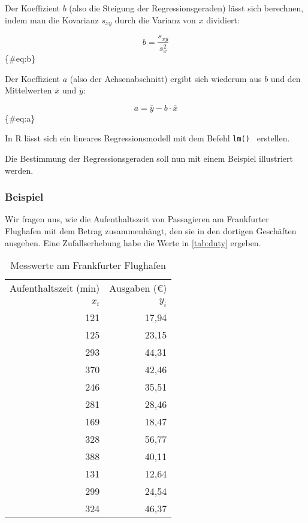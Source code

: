 \documentclass[
  ngerman,
]{article}
\begin{document}
Der Koeffizient \(b\) (also die Steigung der Regressionsgeraden) lässt sich berechnen, indem man die Kovarianz \(s_{xy}\) durch die Varianz von \(x\) dividiert:

\[
b=\frac{s_{xy}}{s^2_x}
\]\{\#eq:b\}

Der Koeffizient \(a\) (also der Achsenabschnitt) ergibt sich wiederum aus \(b\) und den Mittelwerten \(\bar{x}\) und \(\bar{y}\):

\nopagebreak

\[
a=\bar{y}-b\cdot\bar{x}
\]\{\#eq:a\}

\begin{rtip}
In R lässt sich ein lineares Regressionsmodell mit dem Befehl {\tt lm() } erstellen.
\end{rtip}

Die Bestimmung der Regressionsgeraden soll nun mit einem Beispiel illustriert werden.

\hypertarget{beispiel-26}{%
\subsubsection{Beispiel}\label{beispiel-26}}

Wir fragen uns, wie die Aufenthaltszeit von Passagieren am Frankfurter Flughafen mit dem Betrag zusammenhängt, den sie in den dortigen Geschäften ausgeben. Eine Zufallserhebung habe die Werte in \autoref{tab:duty} ergeben.

\begin{table}

\caption{\label{tab:unnamed-chunk-24}\label{tab:duty}Messwerte am Frankfurter Flughafen}
\centering
\begin{tabular}[t]{rr}
\toprule
\multicolumn{1}{c}{Aufenthaltszeit (min)} & \multicolumn{1}{c}{Ausgaben (€)} \\
\cmidrule(l{3pt}r{3pt}){1-1} \cmidrule(l{3pt}r{3pt}){2-2}
$x_i$ & $y_i$\\
\midrule
121 & 17,94\\
125 & 23,15\\
293 & 44,31\\
370 & 42,46\\
246 & 35,51\\
281 & 28,46\\
169 & 18,47\\
328 & 56,77\\
388 & 40,11\\
131 & 12,64\\
299 & 24,54\\
324 & 46,37\\
\bottomrule
\end{tabular}
\end{table}
\end{document}
